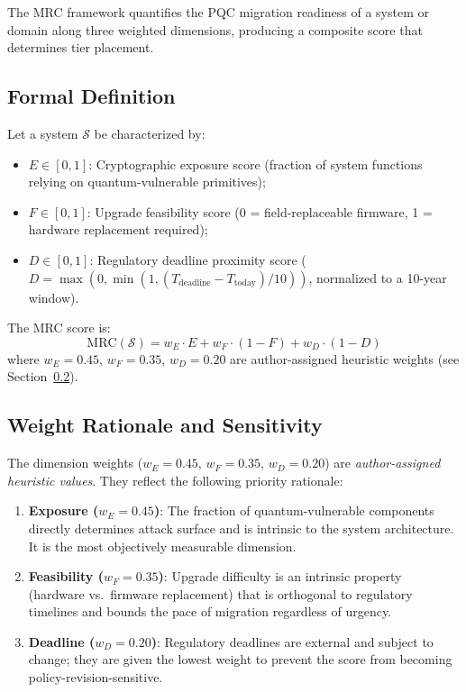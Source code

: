 \documentclass[journal]{IEEEtran}
\begin{document}
The MRC framework quantifies the PQC migration readiness of a system or domain
along three weighted dimensions, producing a composite score that determines
tier placement.

\subsection{Formal Definition}

\begin{definition}
Let a system $\mathcal{S}$ be characterized by:
\begin{itemize}
  \item $E \in [0,1]$: Cryptographic exposure score (fraction of system
  functions relying on quantum-vulnerable primitives);
  \item $F \in [0,1]$: Upgrade feasibility score (0 = field-replaceable
  firmware, 1 = hardware replacement required);
  \item $D \in [0,1]$: Regulatory deadline proximity score ($D = \max(0, \min(1, (T_{\text{deadline}} - T_{\text{today}}) / 10))$,
  normalized to a 10-year window).
\end{itemize}
The MRC score is:
\begin{equation}
  \text{MRC}(\mathcal{S}) = w_E \cdot E + w_F \cdot (1 - F) + w_D \cdot (1 - D)
  \label{eq:mrc}
\end{equation}
where $w_E = 0.45$, $w_F = 0.35$, $w_D = 0.20$ are author-assigned
heuristic weights (see Section~\ref{sec:mrc_weights}).
\end{definition}

\subsection{Weight Rationale and Sensitivity}
\label{sec:mrc_weights}

The dimension weights ($w_E = 0.45$, $w_F = 0.35$, $w_D = 0.20$) are
\emph{author-assigned heuristic values}. They reflect the following priority
rationale:

\begin{enumerate}
  \item \textbf{Exposure ($w_E = 0.45$)}: The fraction of quantum-vulnerable
  components directly determines attack surface and is intrinsic to the system
  architecture. It is the most objectively measurable dimension.
  \item \textbf{Feasibility ($w_F = 0.35$)}: Upgrade difficulty is an intrinsic
  property (hardware vs.\ firmware replacement) that is orthogonal to regulatory
  timelines and bounds the pace of migration regardless of urgency.
  \item \textbf{Deadline ($w_D = 0.20$)}: Regulatory deadlines are external
  and subject to change; they are given the lowest weight to prevent the score
  from becoming policy-revision-sensitive.
\end{enumerate}
\end{document}
